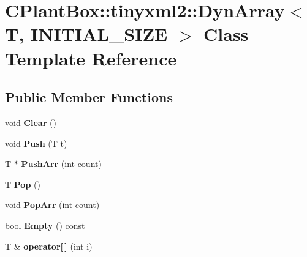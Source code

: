 \hypertarget{classCPlantBox_1_1tinyxml2_1_1DynArray}{}\section{C\+Plant\+Box\+:\+:tinyxml2\+:\+:Dyn\+Array$<$ T, I\+N\+I\+T\+I\+A\+L\+\_\+\+S\+I\+ZE $>$ Class Template Reference}
\label{classCPlantBox_1_1tinyxml2_1_1DynArray}
\subsection*{Public Member Functions}
\begin{DoxyCompactItemize}
\item 
\mbox{\label{classCPlantBox_1_1tinyxml2_1_1DynArray_a4e888a7930175dad2cffb7f77aadfe29}} 
void {\bfseries Clear} ()
\item 
\mbox{\label{classCPlantBox_1_1tinyxml2_1_1DynArray_ad6c1c643f3812bfe189839f81809e22b}} 
void {\bfseries Push} (T t)
\item 
\mbox{\label{classCPlantBox_1_1tinyxml2_1_1DynArray_a77b468fe73f5b1dfa1eb4e5a12eed6b2}} 
T $\ast$ {\bfseries Push\+Arr} (int count)
\item 
\mbox{\label{classCPlantBox_1_1tinyxml2_1_1DynArray_a9f08a0eb0585cacd9058799b7255e0a1}} 
T {\bfseries Pop} ()
\item 
\mbox{\label{classCPlantBox_1_1tinyxml2_1_1DynArray_ae29b9bbe919b4e96684460e1410c2104}} 
void {\bfseries Pop\+Arr} (int count)
\item 
\mbox{\label{classCPlantBox_1_1tinyxml2_1_1DynArray_ad6fb59524f576dd34719c1f4b38d201e}} 
bool {\bfseries Empty} () const
\item 
\mbox{\label{classCPlantBox_1_1tinyxml2_1_1DynArray_a09c53f3c31b720c609da5a582048c3bb}} 
T \& {\bfseries operator\mbox{[}$\,$\mbox{]}} (int i)

\end{DoxyCompactItemize}
